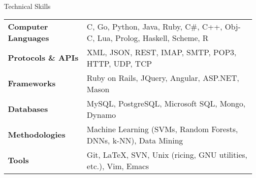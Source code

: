 \documentclass{resume} %
\begin{document}

\begin{rSection}{Technical Skills}

\begin{tabular}{ @{} >{\bfseries}l @{\hspace{1ex}} l }
Computer Languages & C, Go, Python, Java, Ruby, C\#, C++, Obj-C, Lua, Prolog, Haskell, Scheme, R \\
Protocols \& APIs & XML, JSON, REST, IMAP, SMTP, POP3, HTTP, UDP, TCP \\
Frameworks & Ruby on Rails, JQuery, Angular, ASP.NET, Mason \\ 
Databases & MySQL, PostgreSQL, Microsoft SQL, Mongo, Dynamo \\
Methodologies & Machine Learning (SVMs, Random Forests, DNNs, k-NN), Data Mining \\
Tools & Git, LaTeX, SVN, Unix (ricing, GNU utilities, etc.), Vim, Emacs
\end{tabular}

\end{rSection}





\end{document}
